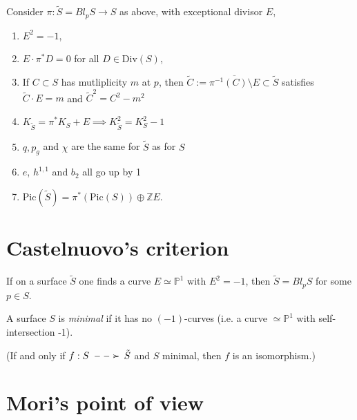 \begin{proposition}
\label{proposition-blowup}
Consider $\pi:\tilde{S}=Bl_pS \to S$
as above, with exceptional divisor $E$,
\begin{enumerate}
\item $E^2=-1$,

\item $E\cdot \pi^*D=0$ for all $D \in
\text{Div}(S)$,

\item If $C \subset S$ has mutliplicity $m$
at $p$, then
$\tilde{C}:= \overline{\pi^{-1}(C) \setminus
E}\subset\tilde{S}$
satisfies
$\tilde{C}\cdot E=m$ and
$\tilde{C}^2=C^2-m^2$

\item $K_{\tilde{S}}=\pi^* K_S+E\implies
K_{\tilde{S}}^2=K_S^2-1$

\item $q,p_g$ and  $\chi$ are the same for
$\tilde{S}$ as for $S$

\item $e$,  $h^{1,1}$ and $b_2$ all go up by
1

\item
$\text{Pic}(\tilde{S})=\pi^*(\text{Pic}(S))
\oplus
\mathbb{Z}E$.
\end{enumerate}
\end{proposition}

\section{Castelnuovo's criterion}
\label{section-castelnuovo-criterion}


\begin{theorem}
\label{theorem-castelnuovo}
If on a surface $\tilde{S}$ one finds a curve
$E \simeq \mathbb{P}^1$
with $E^2=-1$, then $\tilde{S}=Bl_pS$
for some $p \in S$.
\end{theorem}

\begin{definition}
\label{definition-minimal-surface}
A surface $S$ is {\it minimal}
if it has no $(-1)$-curves
(i.e. a curve $\simeq \mathbb{P}^1$ with
self-intersection -1).

(If and only if
$f:S \xymatrix{\ar@{-->}[r]&}\tilde{S}$ and
$S$ minimal,
then $f$ is an isomorphism.)
\end{definition}


\section{Mori's point of view}
\label{section-moris-point-of-view}

